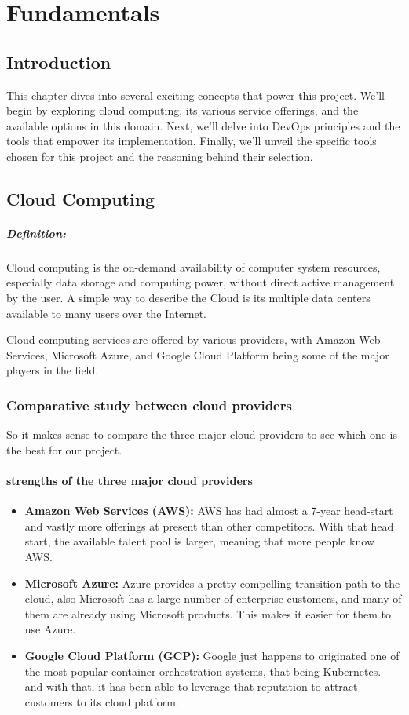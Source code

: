 \chapter{Fundamentals}
\section{Introduction}
This chapter dives into several exciting concepts that power this project. We'll begin by exploring cloud computing, its various service offerings, and the available options in this domain. Next, we'll delve into DevOps principles and the tools that empower its implementation. Finally, we'll unveil the specific tools chosen for this project and the reasoning behind their selection.

\section{Cloud Computing}
\paragraph*{Definition:}
Cloud computing is the on-demand availability of computer system resources, especially data storage and computing power, without direct active management by the user. A simple way to describe the Cloud is its multiple data centers available to many users over the Internet.
\par
\noindent
Cloud computing services are offered by various providers, with Amazon Web Services, Microsoft Azure, and Google Cloud Platform being some of the major players in the field.
\subsection*{Comparative study between cloud providers}
So it makes sense to compare the three major cloud providers to see which one is the best for our project.
\subsubsection*{strengths of the three major cloud providers \cite{webArticle1}}
\begin{itemize}
    \item \textbf{Amazon Web Services (AWS):} AWS has had almost a 7-year head-start and vastly more offerings at present than other competitors. With that head start, the available talent pool is larger, meaning that more people know AWS.
    \item \textbf{Microsoft Azure:} Azure provides a pretty compelling transition path to the cloud, also Microsoft has a large number of enterprise customers, and many of them are already using Microsoft products. This makes it easier for them to use Azure.
    \item \textbf{Google Cloud Platform (GCP):} Google just happens to originated one of the most popular container orchestration systems, that being Kubernetes. and with that, it has been able to leverage that reputation to attract customers to its cloud platform.
\end{itemize}
